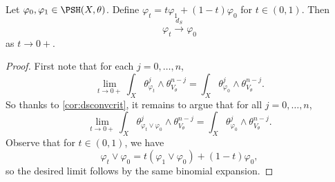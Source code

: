 \begin{corollary}\label{cor:lineardsconv}
    Let $\varphi_0,\varphi_1\in \PSH(X,\theta)$. Define $\varphi_t=t\varphi_1+(1-t)\varphi_0$ for $t\in (0,1)$.
    Then
    \[
    \varphi_t\xrightarrow{d_S}\varphi_0
    \]
    as $t\to 0+$.
\end{corollary}
\begin{proof}
First note that for each $j=0,\ldots,n$,
\[
\lim_{t\to 0+}\int_X \theta_{\varphi_t}^j\wedge \theta_{V_{\theta}}^{n-j}=\int_X \theta_{\varphi_0}^j\wedge \theta_{V_{\theta}}^{n-j}.
\]
So thanks to \cref{cor:dsconvcrit}, it remains to argue that for all $j=0,\ldots,n$,
\[
\lim_{t\to 0+}\int_X \theta_{\varphi_t\lor \varphi_0}^j\wedge \theta_{V_{\theta}}^{n-j}=\int_X \theta_{\varphi_0}^j\wedge \theta_{V_{\theta}}^{n-j}.
\]
Observe that for $t\in (0,1)$, we have
\[
\varphi_t\lor \varphi_0=t(\varphi_1\lor \varphi_0)+(1-t)\varphi_0,
\]
so the desired limit follows by the same binomial expansion.
\end{proof}

